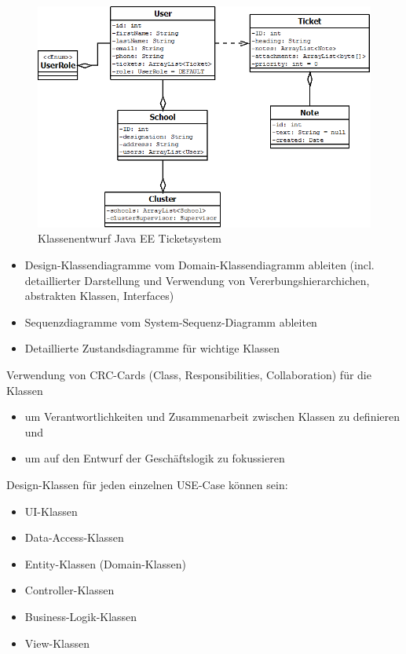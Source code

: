 \begin{figure}[h]
	\centering
	\includegraphics[scale=0.6]{figures/klassenentwurf_java_ticketsys_export.png}
	\caption{Klassenentwurf Java EE Ticketsystem}
	\label{Abb_Klassendesign_TicketSys}
\end{figure}

\begin{itemize}
	\item Design-Klassendiagramme vom Domain-Klassendiagramm ableiten (incl. detaillierter Darstellung und Verwendung von Vererbungshierarchichen, abstrakten Klassen, Interfaces)
	\item Sequenzdiagramme vom System-Sequenz-Diagramm ableiten
	\item 	Detaillierte Zustandsdiagramme für wichtige Klassen
\end{itemize}

Verwendung von CRC-Cards (Class, Responsibilities, Collaboration) für die Klassen
\begin{itemize}
	\item um Verantwortlichkeiten und Zusammenarbeit zwischen Klassen zu definieren und
	\item um auf den Entwurf der Geschäftslogik zu fokussieren
\end{itemize}

Design-Klassen für jeden einzelnen USE-Case können sein:
\begin{itemize}
	\item UI-Klassen
	\item Data-Access-Klassen
	\item Entity-Klassen (Domain-Klassen)
	\item Controller-Klassen
	\item Business-Logik-Klassen
	\item View-Klassen
\end{itemize}

